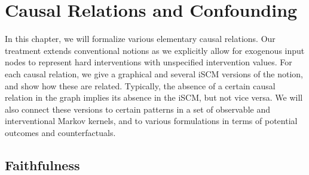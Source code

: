 \section{Causal Relations and Confounding}

In this chapter, we will formalize various elementary causal relations.
Our treatment extends conventional notions as we explicitly allow for exogenous input nodes to represent hard interventions with unspecified intervention values.
For each causal relation, we give a graphical and several iSCM versions of the notion, and show how these are related.
Typically, the absence of a certain causal relation in the graph implies its absence in the iSCM, but not vice versa.
We will also connect these versions to certain patterns in a set of observable and interventional Markov kernels, and to various formulations in terms of potential outcomes and counterfactuals.


\subsection{Faithfulness}

